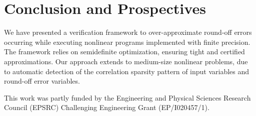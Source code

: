 \documentclass[preprint]{sigplanconf}
\theoremstyle{plain}
\begin{document}
\section{Conclusion and Prospectives} %
%
We have presented a verification framework to over-approximate round-off errors occurring while executing nonlinear programs implemented with finite precision.
The framework relies on semidefinite optimization, ensuring tight and certified approximations. Our approach extends to medium-size nonlinear problems, due to  automatic detection of the correlation sparsity pattern of input variables and round-off error variables.

\appendix
{}\fi
\acks
This work was partly funded by the Engineering and Physical Sciences Research Council (EPSRC) Challenging Engineering Grant (EP/I020457/1).





\fi
\end{document}
